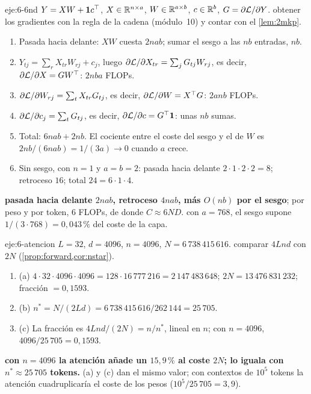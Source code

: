 \begin{solucion}{eje:6-6nd}
\datos $Y=XW+\mathbf{1} c^{\top}$, $X\in\mathbb{R}^{n\times a}$, $W\in\mathbb{R}^{a\times b}$, $c\in\mathbb{R}^{b}$, $G=\partial\mathcal{L}/\partial Y$.
\planteamiento obtener los gradientes con la regla de la cadena (módulo~10) y contar con el \cref{lem:2mkp}.
\pasos
\begin{enumerate}[label=\arabic*.]
  \item Pasada hacia delante: $XW$ cuesta $2nab$; sumar el sesgo a las $nb$ entradas, $nb$.
  \item $Y_{tj}=\sum_rX_{tr}W_{rj}+c_j$, luego $\partial\mathcal{L}/\partial X_{tr}=\sum_jG_{tj}W_{rj}$, es decir, $\partial\mathcal{L}/\partial X=GW^{\top}$: $2nba$ FLOPs.
  \item $\partial\mathcal{L}/\partial W_{rj}=\sum_tX_{tr}G_{tj}$, es decir, $\partial\mathcal{L}/\partial W=X^{\top} G$: $2anb$ FLOPs.
  \item $\partial\mathcal{L}/\partial c_j=\sum_tG_{tj}$, es decir, $\partial\mathcal{L}/\partial c=G^{\top}\mathbf{1}$: unas $nb$ sumas.
  \item Total: $6nab+2nb$. El cociente entre el coste del sesgo y el de $W$ es $2nb/(6nab)=1/(3a)\to 0$ cuando $a$ crece.
  \item Sin sesgo, con $n=1$ y $a=b=2$: pasada hacia delante $2\cdot 1\cdot 2\cdot 2=8$; retroceso $16$; total $24=6\cdot 1\cdot 4$.
\end{enumerate}
\resultado \textbf{pasada hacia delante $2nab$, retroceso $4nab$, más $O(nb)$ por el sesgo}; por peso y por token, $6$ FLOPs, de donde $C\approx 6ND$.
\comprobacion con $a=768$, el sesgo supone $1/(3\cdot 768)=0{,}043\,\%$ del coste de la capa.
\end{solucion}

\begin{solucion}{eje:6-atencion}
\datos $L=32$, $d=4096$, $n=4096$, $N=6\,738\,415\,616$.
\planteamiento comparar $4Lnd$ con $2N$ (\cref{prop:forward,cor:nstar}).
\pasos
\begin{enumerate}[label=\arabic*.]
  \item (a) $4\cdot 32\cdot 4096\cdot 4096=128\cdot 16\,777\,216=2\,147\,483\,648$; $2N=13\,476\,831\,232$; fracción $=0{,}1593$.
  \item (b) $n^{*}=N/(2Ld)=6\,738\,415\,616/262\,144=25\,705$.
  \item (c) La fracción es $4Lnd/(2N)=n/n^{*}$, lineal en $n$; con $n=4096$, $4096/25\,705=0{,}1593$.
\end{enumerate}
\resultado \textbf{con $n=4096$ la atención añade un $15{,}9\,\%$ al coste $2N$; lo iguala con $n^{*}\approx 25\,705$ tokens.}
\comprobacion (a) y (c) dan el mismo valor; con contextos de $10^{5}$ tokens la atención cuadruplicaría el coste de los pesos ($10^{5}/25\,705=3{,}9$).
\end{solucion}
